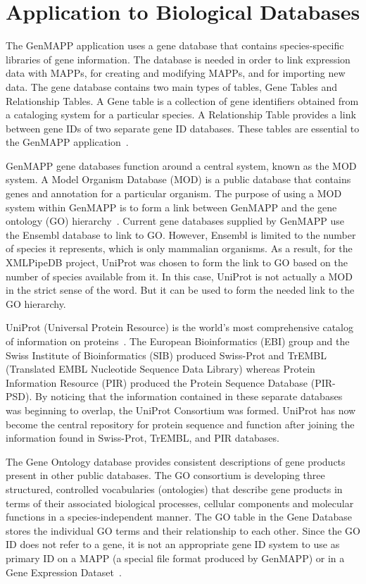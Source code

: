 \section{Application to Biological Databases}
\label{biodb}
The GenMAPP application uses a gene database that contains species-specific
libraries of gene information.  The database is needed in order to link expression
data with MAPPs, for creating and modifying MAPPs, and for importing new data.
The gene database contains two main types of tables, Gene Tables and Relationship
Tables.  A Gene table is a collection of gene identifiers obtained from a
cataloging system for a particular species.  A Relationship Table provides a link
between gene IDs of two separate gene ID databases.  These tables are essential to
the GenMAPP application~\cite{noSupport}.

GenMAPP gene databases function around a central system, known as the MOD system.
A Model Organism Database (MOD) is a public database that contains genes and
annotation for a particular organism.
The purpose of using a MOD system within GenMAPP is to form a link between
GenMAPP and the gene ontology (GO) hierarchy~\cite{noSupport}.  Current gene
databases supplied by GenMAPP use the Ensembl database to link to GO.  However,
Ensembl is limited to the number of species it represents, which is only
mammalian organisms.
As a result, for the XMLPipeDB project, UniProt was chosen to form the link to GO
based on the number of species available from it.  In this case, UniProt is not
actually a MOD in the strict sense of the word.  But it can be used to form the
needed link to the GO hierarchy.

UniProt (Universal Protein Resource) is the world's most comprehensive catalog of
information on proteins~\cite{uniprotWeb}.
The European Bioinformatics (EBI) group and the
Swiss Institute of Bioinformatics (SIB) produced Swiss-Prot and TrEMBL
(Translated EMBL Nucleotide Sequence Data Library)
whereas
Protein Information Resource (PIR) produced the Protein Sequence Database (PIR-PSD).
By noticing that the information contained in these separate databases was beginning
to overlap, the UniProt Consortium was formed.
UniProt has now become the central repository
for protein sequence and function after joining the information found in
Swiss-Prot, TrEMBL, and PIR databases.

The Gene Ontology database provides consistent descriptions of gene products present
in other public databases. The GO consortium is developing three structured, controlled
vocabularies (ontologies) that describe gene products in
terms of their associated biological processes, cellular components and molecular functions
in a species-independent manner. The GO table in the Gene Database stores the individual
GO terms and their relationship to each other. Since the GO ID does not refer to a gene,
it is not an appropriate gene ID system to use as primary ID on a MAPP 
(a special file format produced by GenMAPP) or in a Gene Expression Dataset~\cite{genmapp}.
